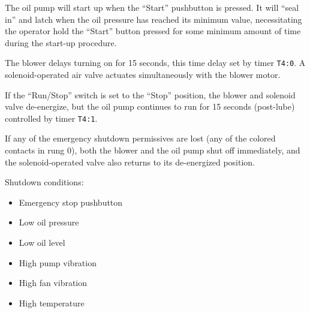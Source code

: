 
The oil pump will start up when the ``Start'' pushbutton is pressed.  It will ``seal in'' and latch when the oil pressure has reached its minimum value, necessitating the operator hold the ``Start'' button pressed for some minimum amount of time during the start-up procedure.

\vskip 10pt

The blower delays turning on for 15 seconds, this time delay set by timer {\tt T4:0}.  A solenoid-operated air valve actuates simultaneously with the blower motor.

\vskip 10pt

If the ``Run/Stop'' switch is set to the ``Stop'' position, the blower and solenoid valve de-energize, but the oil pump continues to run for 15 seconds (post-lube) controlled by timer {\tt T4:1}.

\vskip 10pt

If any of the emergency shutdown permissives are lost (any of the colored contacts in rung 0), both the blower and the oil pump shut off immediately, and the solenoid-operated valve also returns to its de-energized position.

\vskip 10pt

Shutdown conditions:

\begin{itemize}
\item{} Emergency stop pushbutton
\item{} Low oil pressure
\item{} Low oil level
\item{} High pump vibration
\item{} High fan vibration
\item{} High temperature
\end{itemize}












